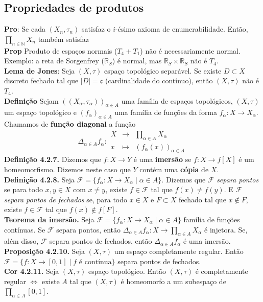 \documentclass{article}
\begin{document}
\begin{landscape}
\begin{multicols}{3}
\subsection{Propriedades de produtos}
\textbf{Pro}: Se cada $(X_n, \tau_n)$ satisfaz o $i$-ésimo axioma de enumerabilidade. Então, $\prod_{n \in \mathbb{N}} X_n$ também satisfaz\\
\textbf{Prop } Produto de espaços normais ($T_{4} + T_{1}$) não é necessariamente normal. Exemplo: a reta de Sorgenfrey ($\mathbb{R}_{S}$) é normal, mas $\mathbb{R}_{S} \times \mathbb{R}_{S}$ não é $T_{4}$. \\
\textbf{Lema de Jones}: Seja $(X, \tau)$ espaço topológico separável. Se existe $D \subset X$ discreto fechado tal que $|D| = \mathfrak{c}$ (cardinalidade do contínuo), então $(X, \tau)$ não é $T_4$.\\
\textbf{Definição} Sejam $((X_\alpha, \tau_\alpha))_{\alpha \in A}$ uma família de espaços topológicos, $(X, \tau)$ um espaço topológico e $(f_\alpha)_{\alpha \in A}$ uma família de funções da forma $f_\alpha : X \to X_\alpha$. Chamamos de \textbf{função diagonal} a função
\[
\Delta_{\alpha \in A} f_\alpha : 
\begin{array}{ccc}
X & \to & \prod_{\alpha \in A} X_\alpha \\
x & \mapsto & (f_\alpha(x))_{\alpha \in A}
\end{array}
\]
\textbf{Definição 4.2.7.} Dizemos que $f : X \to Y$ é uma \textbf{imersão} se $f : X \to f[X]$ é um homeomorfismo. Dizemos neste caso que $Y$ contém uma \textbf{cópia} de $X$.\\
\textbf{Definição 4.2.8.} Seja $\mathcal{F} = \{f_\alpha : X \to X_\alpha \mid \alpha \in A\}$. Dizemos que $\mathcal{F}$ \textit{separa pontos} se para todo $x, y \in X$  com $x\not = y$, existe $f \in \mathcal{F}$ tal que $f(x) \neq f(y)$. E $\mathcal{F}$ \textit{separa pontos de fechados} se, para todo $x \in X$ e $F \subset X$ fechado tal que $x \notin F$, existe $f \in \mathcal{F}$ tal que $f(x) \notin f[F]$.\\
\textbf{Teorema da imersão.} Seja $\mathcal{F} = \{f_\alpha : X \to X_\alpha \mid \alpha \in A\}$ família de funções contínuas. Se $\mathcal{F}$ separa pontos, então $\Delta_{\alpha \in A} f_\alpha : X \to \prod_{\alpha \in A} X_\alpha$ é injetora. Se, além disso, $\mathcal{F}$ separa pontos de fechados, então $\Delta_{\alpha \in A} f_\alpha$ é uma imersão.\\
\textbf{Proposição 4.2.10.} Seja $(X, \tau)$ um espaço completamente regular. Então $\mathcal{F} = \{f : X \to [0,1] \mid f \text{ é contínua}\}$ separa pontos de fechados.\\
\textbf{Cor 4.2.11.} Seja $(X, \tau)$ espaço topológico. Então $(X, \tau)$ é completamente regular $\Leftrightarrow$ existe $A$ tal que $(X, \tau)$ é homeomorfo a um subespaço de $\prod_{\alpha \in A} [0,1]$.


\end{multicols}
\end{landscape}
\end{document}
